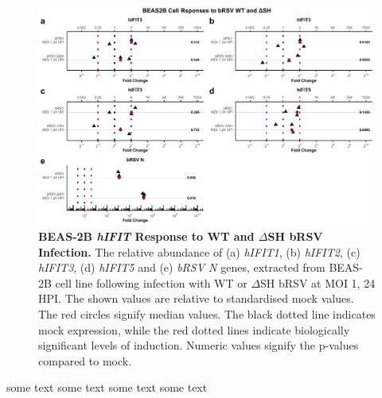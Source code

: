 \begin{figure}
    \centering
    \includegraphics[width=1\linewidth]{06. Chapter 1/Figs/01. Induction/11. beas2b_brsv_moi1.pdf}
    \caption[BEAS-2B \textit{hIFIT} Response to WT and \(\Delta\)SH bRSV Infection.]{\textbf{BEAS-2B \textit{hIFIT} Response to WT and \(\Delta\)SH bRSV Infection.} The relative abundance of (a) \textit{hIFIT1}, (b) \textit{hIFIT2}, (c) \textit{hIFIT3}, (d) \textit{hIFIT5} and (e) \textit{bRSV N} genes, extracted from BEAS-2B cell line following infection with WT or \(\Delta\)SH bRSV at MOI 1, 24 HPI.  The shown values are relative to standardised mock values. The red circles signify median values. The black dotted line indicates mock expression, while the red dotted lines indicate biologically significant levels of induction. Numeric values signify the p-values compared to mock.}
    \label{BEAS-2B responses to bRSV WT and dSH.}
\end{figure}

some text some text some text some text


